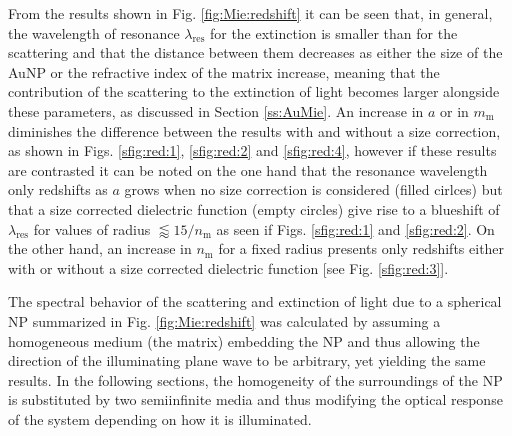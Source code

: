 From the results shown in Fig. \ref{fig:Mie:redshift} it can be seen that, in general, the wavelength of resonance  $\lambda_\text{res}$ for the extinction is smaller than for the scattering  and that the distance between them decreases as either the size of the AuNP or the refractive index of the matrix increase, meaning that the contribution of the scattering to the extinction of light becomes larger alongside these parameters, as discussed in Section \ref{ss:AuMie}. An increase in $a$ or in $m_\text{m}$ diminishes the difference between the results with and without a size correction, as shown in Figs. \ref{sfig:red:1}, \ref{sfig:red:2} and \ref{sfig:red:4},  however if these results are contrasted  it can be noted on the one hand that the resonance wavelength only redshifts as $a$ grows when no size correction is considered (filled cirlces) but that a size corrected dielectric function (empty circles) give rise to a blueshift of $\lambda_\text{res}$ for values of radius $\lessapprox 15/n_\text{m}$ as seen if Figs. \ref{sfig:red:1} and \ref{sfig:red:2}. On the other hand, an increase in $n_\text{m}$ for a fixed radius presents only redshifts either with or without a size corrected dielectric function [see Fig. \ref{sfig:red:3}].

The spectral behavior of the scattering and extinction of light due to a spherical NP summarized in Fig. \ref{fig:Mie:redshift} was calculated by assuming a homogeneous medium (the matrix) embedding the NP and thus allowing the direction of the illuminating plane wave to be arbitrary, yet yielding the same results. In the following sections, the homogeneity of the surroundings of the NP is substituted by two semiinfinite media and thus modifying the optical response of the system depending on how it is illuminated.
